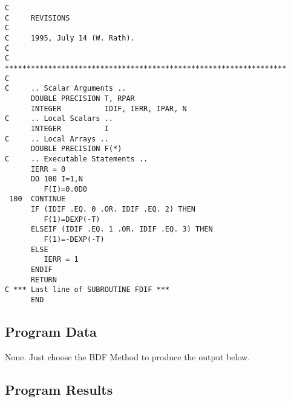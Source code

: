 \begin{verbatim}
C
C     REVISIONS
C
C     1995, July 14 (W. Rath).
C
C     *****************************************************************
C
C     .. Scalar Arguments ..
      DOUBLE PRECISION T, RPAR
      INTEGER          IDIF, IERR, IPAR, N
C     .. Local Scalars ..
      INTEGER          I
C     .. Local Arrays ..
      DOUBLE PRECISION F(*)
C     .. Executable Statements ..
      IERR = 0
      DO 100 I=1,N
         F(I)=0.0D0
 100  CONTINUE
      IF (IDIF .EQ. 0 .OR. IDIF .EQ. 2) THEN
         F(1)=DEXP(-T)
      ELSEIF (IDIF .EQ. 1 .OR. IDIF .EQ. 3) THEN
         F(1)=-DEXP(-T)
      ELSE
         IERR = 1
      ENDIF
      RETURN
C *** Last line of SUBROUTINE FDIF ***
      END
\end{verbatim}

\subsection{Program Data}

None. Just choose the BDF Method to produce the output below.

\subsection{Program Results}

